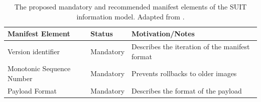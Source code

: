 \documentclass[0-thesis.tex]{subfiles}
\begin{document}
\begin{longtable}[]{@{}lll@{}}
    \caption{The proposed mandatory and recommended manifest elements of the SUIT information model. Adapted from \parencite{suit-information-model}.}
    \label{tab:manifest-elements}\\
    \toprule
    \begin{minipage}[b]{0.23\columnwidth}\raggedright\strut
    Manifest Element\strut
    \end{minipage} & \begin{minipage}[b]{0.26\columnwidth}\raggedright\strut
    Status\strut
    \end{minipage} & \begin{minipage}[b]{0.42\columnwidth}\raggedright\strut
    Motivation/Notes\strut
    \end{minipage}\tabularnewline
    \midrule
    \endhead
    \begin{minipage}[t]{0.23\columnwidth}\raggedright\strut
    Version identifier\strut
    \end{minipage} & \begin{minipage}[t]{0.26\columnwidth}\raggedright\strut
    Mandatory\strut
    \end{minipage} & \begin{minipage}[t]{0.42\columnwidth}\raggedright\strut
    Describes the iteration of the manifest format\strut
    \end{minipage}\tabularnewline
    \begin{minipage}[t]{0.23\columnwidth}\raggedright\strut
    Monotonic Sequence Number\strut
    \end{minipage} & \begin{minipage}[t]{0.26\columnwidth}\raggedright\strut
    Mandatory\strut
    \end{minipage} & \begin{minipage}[t]{0.42\columnwidth}\raggedright\strut
    Prevents rollbacks to older images\strut
    \end{minipage}\tabularnewline
    \begin{minipage}[t]{0.23\columnwidth}\raggedright\strut
    Payload Format\strut
    \end{minipage} & \begin{minipage}[t]{0.26\columnwidth}\raggedright\strut
    Mandatory\strut
    \end{minipage} & \begin{minipage}[t]{0.42\columnwidth}\raggedright\strut
    Describes the format of the payload\strut
    \end{minipage}\tabularnewline

\end{longtable}
\end{document}
